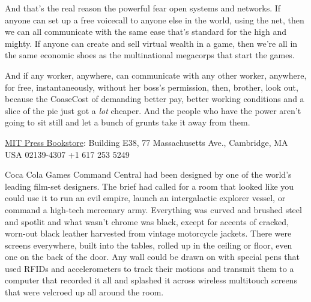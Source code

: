 And that's the real reason the powerful fear open systems and
networks. If anyone can set up a free voicecall to anyone else in
the world, using the net, then we can all communicate with the same
ease that's standard for the high and mighty. If anyone can create
and sell virtual wealth in a game, then we're all in the same
economic shoes as the multinational megacorps that start the
games.

And if any worker, anywhere, can communicate with any other worker,
anywhere, for free, instantaneously, without her boss's permission,
then, brother, look out, because the CoaseCost of demanding better
pay, better working conditions and a slice of the pie just got a
\emph{lot} cheaper. And the people who have the power aren't going
to sit still and let a bunch of grunts take it away from them.

\tb

{\href{http://web.mit.edu/bookstore/www/}{MIT Press Bookstore}: Building E38, 77 Massachusetts Ave., Cambridge, MA USA 02139-4307 +1 617 253 5249}

Coca Cola Games Command Central had been designed by one of the
world's leading film-set designers. The brief had called for a room
that looked like you could use it to run an evil empire, launch an
intergalactic explorer vessel, or command a high-tech mercenary
army. Everything was curved and brushed steel and spotlit and what
wasn't chrome was black, except for accents of cracked, worn-out
black leather harvested from vintage motorcycle jackets. There were
screens everywhere, built into the tables, rolled up in the ceiling
or floor, even one on the back of the door. Any wall could be drawn
on with special pens that used RFIDs and accelerometers to track
their motions and transmit them to a computer that recorded it all
and splashed it across wireless multitouch screens that were
velcroed up all around the room.

